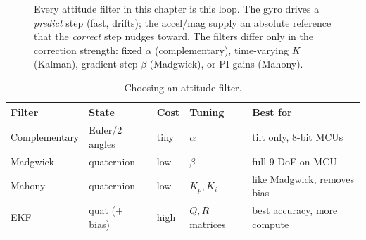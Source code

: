\begin{figure}[H]
\centering
{}
\caption{Every attitude filter in this chapter is this loop. The gyro drives a
\emph{predict} step (fast, drifts); the accel/mag supply an absolute reference that the
\emph{correct} step nudges toward. The filters differ only in the correction strength:
fixed $\alpha$ (complementary), time-varying $K$ (Kalman), gradient step $\beta$
(Madgwick), or PI gains (Mahony).}
\label{ch36:fig-loop}
\end{figure}

\begin{table}[H]
\centering
\caption{Choosing an attitude filter.}
\label{ch36:tab-filters}
\begin{tabular}{@{}lllll@{}}
\toprule
Filter & State & Cost & Tuning & Best for \\
\midrule
Complementary & Euler/2 angles & tiny    & $\alpha$        & tilt only, 8-bit MCUs \\
Madgwick      & quaternion     & low     & $\beta$         & full 9-DoF on MCU \\
Mahony        & quaternion     & low     & $K_p,K_i$       & like Madgwick, removes bias \\
EKF           & quat ($+$ bias)& high    & $Q,R$ matrices  & best accuracy, more compute \\
\bottomrule
\end{tabular}
\end{table}

